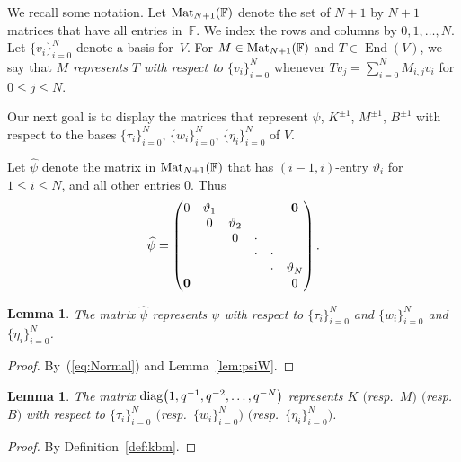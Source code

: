 \documentclass[pdftex]{sigma}
\numberwithin{equation}{section}
\newtheorem{Lemma}[Theorem]{Lemma}
\begin{document}
We recall some notation.
Let ${\rm Mat}_{N+1}(\mathbb F)$ denote the set of
 $N+1$ by $N+1$ matrices that have all entries in~$\mathbb F$.
We index the rows and columns by $0,1,\ldots, N$.
Let $\lbrace v_i \rbrace_{i=0}^N$ denote a basis for~$V$.
For $M \in
{\rm Mat}_{N+1}(\mathbb F)$ and
$T \in \operatorname{End}(V)$, we say that {\it $M$ represents $T$ with
respect to
$\lbrace v_i \rbrace_{i=0}^N$} whenever
$Tv_j = \sum_{i=0}^N M_{i,j} v_i$ for $0 \leq j \leq N$.


Our next goal is to display the matrices that represent
$\psi$, $K^{\pm 1}$, $M^{\pm 1}$, $B^{\pm 1}$ with respect to
the bases $\lbrace \tau_i\rbrace_{i=0}^N$,
$\lbrace w_i\rbrace_{i=0}^N$,
 $\lbrace \eta_i\rbrace_{i=0}^N$ of $V$.

\begin{Definition}\label{def:psimat}
Let $\widehat \psi$ denote the matrix in
${\rm Mat}_{N+1}(\mathbb F)$
that has $(i-1,i)$-entry $\vartheta_i$
for $1 \leq i \leq N$,
and all other entries 0. Thus
\begin{gather*}
 {\widehat \psi} =
	 \left(
	 \begin{matrix}
	 0 & \vartheta_1 & & & & {\bf 0} \\
	 & 0 & \vartheta_2 & & & \\
		 & & 0 & \cdot & &
		 \\
		 && & \cdot & \cdot&
		 \\
		 & & & & \cdot & \vartheta_N \\
		 {\bf 0} & & & & & 0
		 \end{matrix}
		 \right).
\end{gather*}
\end{Definition}

\begin{Lemma}\label{Psirep}
The matrix $\widehat \psi$
represents $\psi$ with respect to
$\lbrace \tau_i \rbrace_{i=0}^N$ and
$\lbrace w_i \rbrace_{i=0}^N$ and
$\lbrace \eta_i \rbrace_{i=0}^N$.
\end{Lemma}
\begin{proof} By~(\ref{eq:Normal})
and Lemma~\ref{lem:psiW}.
\end{proof}

\begin{Lemma}\label{Diag}
The matrix ${\rm diag}\big(1,q^{-1},q^{-2},\ldots, q^{-N}\big)$
represents $K$ $($resp.~$M)$ $($resp.~$B)$ with respect to
$\lbrace \tau_i \rbrace_{i=0}^N$
$($resp.~$\lbrace w_i \rbrace_{i=0}^N)$
$($resp.~$\lbrace \eta_i \rbrace_{i=0}^N)$.
\end{Lemma}
\begin{proof} By Definition~\ref{def:kbm}.
\end{proof}
\end{document}
